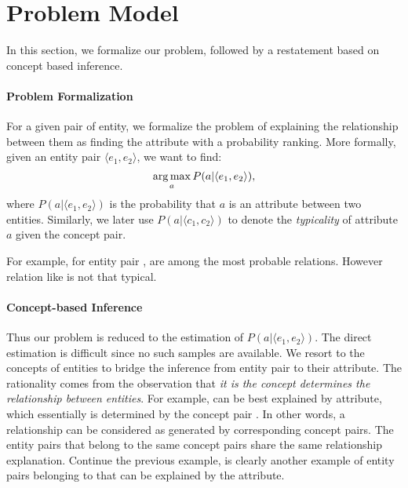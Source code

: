 
\section{Problem Model}
\label{sec:framework}

In this section, we formalize our problem, followed by a restatement based on concept based inference.

\paragraph{Problem Formalization}
For a given pair of entity, we formalize the problem of explaining the relationship between them as finding the attribute with a probability ranking.
More formally, given an entity pair $ \langle e_1, e_2 \rangle $, we want to find:
\begin{equation}
\operatorname*{arg\,max}_a P(a|\langle e_1,e_2 \rangle),
\end{equation}
where $P(a| \langle e_1, e_2 \rangle )$ is the probability that $a$ is an attribute between two entities. Similarly, we later use $P(a| \langle c_{1},c_{2} \rangle )$ to denote the {\it typicality} of attribute $a$ given the concept pair.

For example, for entity pair ,  are among the most probable relations.
However relation like  is not that typical. 


\paragraph{Concept-based Inference}
Thus our problem is reduced to the estimation of $P(a| \langle e_1, e_2 \rangle )$.
The direct estimation is difficult since no such samples are available.
We resort to the concepts of entities to bridge the inference from entity pair to their attribute.
The rationality comes from the observation that {\it it is the concept determines the relationship between entities}. For example,  can be best explained by  attribute, which essentially is determined by the concept pair .
In other words, a relationship can be considered as generated by corresponding concept pairs.
The entity pairs that belong to the same concept pairs share the same relationship explanation.
Continue the previous example,  is clearly another example of entity pairs belonging to  that can be explained by the  attribute.

